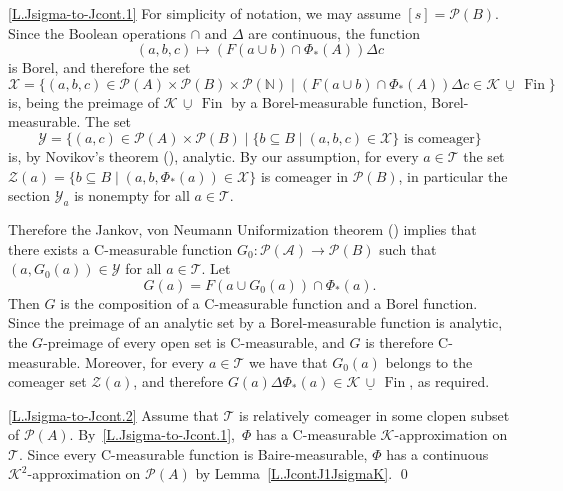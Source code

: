 \documentclass{amsart}
\makeatletter
\def\Fin{{\rm Fin}}   %
\def\A{{\mathcal A}}
\def\text{\mbox}
\theoremstyle{definition}
\theoremstyle{remark}
\newcommand{\ucup}{\,\underline{\cup}\,}
\def\Fin{\operatorname{Fin}}
\newcommand{\cK}{{\mathcal K}}
\renewcommand{\proofname}{Proof}
\renewenvironment{proof}[1][\proofname]{\par
\let\oldqedsymbol\qedsymbol             %
  \normalfont
  \topsep6\p@\@plus6\p@ \trivlist
  \item[\hskip\labelsep\hskip\parindent\scshape
    #1\@addpunct{.}]\ignorespaces
}{%
  \qed\endtrivlist
\global\let\qedsymbol\oldqedsymbol      %
}
\newcommand{\cP}{\mathcal P}
\newcommand{\bbN}{\mathbb N}
\newcommand{\cT}{\mathcal T}
\newcommand{\cX}{\mathcal X}
\newcommand{\cY}{\mathcal Y}
\newcommand{\cZ}{\mathcal Z}
\numberwithin{claim}{subsection}
\makeatother
\begin{document}
\begin{proof} \eqref{L.Jsigma-to-Jcont.1} For simplicity of notation, we may assume $[s]=\cP(B)$. 
	Since the Boolean operations $\cap$ and $\Delta$ are continuous, the function 
	\[
	(a,b,c)\mapsto (F(a\cup b)\cap \Phi_*(A))\Delta c
	\] 
	is Borel, and therefore the set 
	\[
	\cX=\{(a,b,c)\in \cP(A)\times \cP(B)\times \cP(\bbN)\mid (F(a\cup b)\cap \Phi_*(A))\Delta c\in \cK\ucup \Fin\}
	\]
	is, being the preimage of $\cK\ucup \Fin$ by a Borel-measurable function, Borel-measurable. 
	The set
	\[
	\cY=\{(a,c)\in \cP(A)\times \cP(B)\mid \{b\subseteq B\mid (a,b,c)\in \cX\}\text{ is comeager}\}
	\]
	is, by Novikov's theorem (\cite[Theorem~29.3]{Ke:Classical}), analytic. By our assumption, for every $a\in \cT$ the set $\cZ(a)=\{b\subseteq B \mid (a,b,\Phi_*(a))\in \cX\}$ is comeager in $\cP(B)$, in particular the section $\cY_a$ is nonempty for all $a\in \cT$. 
	
	Therefore the Jankov, von Neumann Uniformization theorem (\cite[18.A]{Ke:Classical}) implies that there exists a C-measurable function 
	$
	G_0\colon \cP(\A)\to \cP(B)
	$
	such that $(a,G_0(a))\in \cY$ for all $a\in \cT$. 
	Let 
	\[
	G(a)=F(a\cup G_0(a))\cap \Phi_*(a). 
	\]
	Then $G$ is the composition of a C-measurable function and a Borel function. Since the preimage of an analytic set by a Borel-measurable function is analytic, the $G$-preimage of every open set  is  C-measurable, and $G$ is therefore C-measurable. Moreover, for every $a\in \cT$ we have that $G_0(a)$ belongs to the comeager set $\cZ(a)$, and therefore $G(a)\Delta \Phi_*(a)\in \cK\ucup\Fin$, as required.  
	
	\eqref{L.Jsigma-to-Jcont.2} Assume that $\cT$ is relatively comeager in some clopen subset of $\cP(A)$. By~\eqref{L.Jsigma-to-Jcont.1},~$\Phi$ has a C-measurable $\cK$-approximation on $\cT$. Since every C-measurable function is Baire-measurable, $\Phi$ has a continuous $\cK^2$-approximation on $\cP(A)$ by Lemma~\ref{L.JcontJ1JsigmaK}. 
\end{proof}
\end{document}
